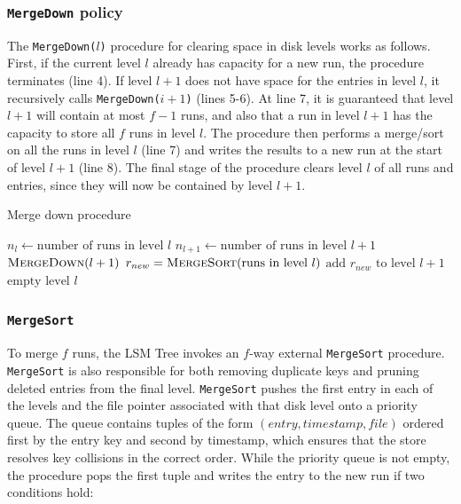 \documentclass{acm}
\begin{document}
\subsubsection{\texttt{MergeDown} policy}

The \texttt{MergeDown($l$)} procedure for clearing space in disk levels works as follows. First, if the current level $l$ already has capacity for a new run, the procedure terminates (line 4). If level $l+1$ does not have space for the entries in level $l$, it recursively calls \texttt{MergeDown($i+1$)} (lines 5-6). At line 7, it is guaranteed that level $l+1$ will contain at most $f-1$ runs, and also that a run in level $l+1$ has the capacity to store all $f$ runs in level $l$. The procedure then performs a merge/sort on all the runs in level $l$ (line 7) and writes the results to a new run at the start of level $l+1$ (line 8). The final stage of the procedure clears level $l$ of all runs and entries, since they will now be contained by level $l+1$.

\begin{algorithm}[b]
\caption{Merge down procedure}
\begin{algorithmic}[1]
\State $n_l \gets \text{number of runs in level } l$
\State $n_{l+1} \gets \text{number of runs in level } l+1$
\Return
\EndIf
{}
\State $\Call{MergeDown}{l+1}$
\EndIf
\State $r_{new} = \Call{MergeSort}{\text{runs in level } l}$
\State $\text{add } r_{new} \text{ to level } l + 1$
\State $\text{empty level } l$
\EndProcedure
\end{algorithmic}
\end{algorithm}

\subsubsection{\texttt{MergeSort}}

To merge $f$ runs, the LSM Tree invokes an $f$-way external \texttt{MergeSort} procedure. \texttt{MergeSort} is also responsible for both removing duplicate keys and pruning deleted entries from the final level. \texttt{MergeSort} pushes the first entry in each of the levels and the file pointer associated with that disk level onto a priority queue. The queue contains tuples of the form $(entry, timestamp, file)$ ordered first by the entry key and second by timestamp, which ensures that the store resolves key collisions in the correct order. While the priority queue is not empty, the procedure pops the first tuple and writes the entry to the new run if two conditions hold:
\end{document}
